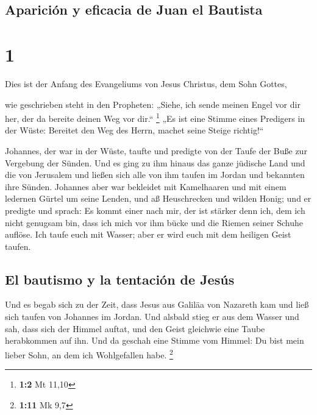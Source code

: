 \hypertarget{apariciuxf3n-y-eficacia-de-juan-el-bautista}{%
\subsection{Aparición y eficacia de Juan el
Bautista}\label{apariciuxf3n-y-eficacia-de-juan-el-bautista}}

\hypertarget{section}{%
\section{1}\label{section}}

 Dies ist der Anfang des Evangeliums von Jesus Christus,
dem Sohn Gottes,

 wie geschrieben steht in den Propheten: „Siehe, ich sende
meinen Engel vor dir her, der da bereite deinen Weg vor dir.``
\footnote{\textbf{1:2} Mt 11,10}  „Es ist eine Stimme
eines Predigers in der Wüste: Bereitet den Weg des Herrn, machet seine
Steige richtig!{}``

 Johannes, der war in der Wüste, taufte und predigte von
der Taufe der Buße zur Vergebung der Sünden.  Und es ging
zu ihm hinaus das ganze jüdische Land und die von Jerusalem und ließen
sich alle von ihm taufen im Jordan und bekannten ihre Sünden.
 Johannes aber war bekleidet mit Kamelhaaren und mit einem
ledernen Gürtel um seine Lenden, und aß Heuschrecken und wilden Honig;
 und er predigte und sprach: Es kommt einer nach mir, der
ist stärker denn ich, dem ich nicht genugsam bin, dass ich mich vor ihm
bücke und die Riemen seiner Schuhe auflöse.  Ich taufe
euch mit Wasser; aber er wird euch mit dem heiligen Geist taufen.

\hypertarget{el-bautismo-y-la-tentaciuxf3n-de-jesuxfas}{%
\subsection{El bautismo y la tentación de
Jesús}\label{el-bautismo-y-la-tentaciuxf3n-de-jesuxfas}}

 Und es begab sich zu der Zeit, dass Jesus aus Galiläa von
Nazareth kam und ließ sich taufen von Johannes im Jordan.
 Und alsbald stieg er aus dem Wasser und sah, dass sich
der Himmel auftat, und den Geist gleichwie eine Taube herabkommen auf
ihn.  Und da geschah eine Stimme vom Himmel: Du bist mein
lieber Sohn, an dem ich Wohlgefallen habe. \footnote{\textbf{1:11} Mk
  9,7}

